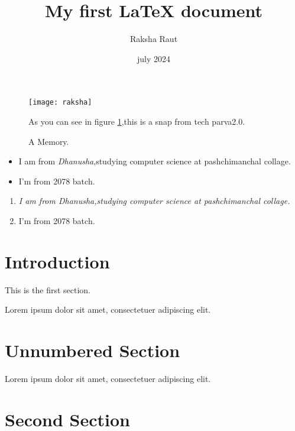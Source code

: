 \documentclass[12pt, letterpaper, twoside]{article}
\title{My first LaTeX document}
\author{Raksha Raut}
\date{july 2024}
\begin{document}
\parindent0pt%
\maketitle
\begin{figure}[h]
    \centering
    \texttt{[image: raksha]}
    \caption{A Memory.}
    \label{raksha}

 
As you can see in figure \ref{raksha},this is a snap from tech parva2.0.
\end{figure}


\begin{itemize}
  \item I am from \emph{Dhanusha},studying computer science at pashchimanchal collage.
  \item I'm from 2078 batch.
\end{itemize}

\begin{enumerate}
  \item \textit{I am from \emph{Dhanusha},studying computer science at pashchimanchal collage.}
  \item I'm from 2078 batch.

\end{enumerate}
\maketitle
  
\tableofcontents

\section{Introduction}
   
This is the first section.
      
Lorem  ipsum  dolor  sit  amet,  consectetuer  adipiscing  
elit. 
\section*{Unnumbered Section}

Lorem ipsum dolor sit amet, consectetuer adipiscing elit.  

\section{Second Section}
       
\end{document}
